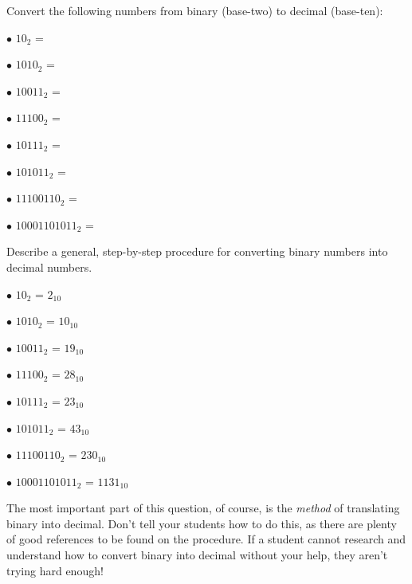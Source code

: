 

Convert the following numbers from binary (base-two) to decimal (base-ten):

\medskip
\item{$\bullet$} $10_2$ =
\item{$\bullet$} $1010_2$ =
\item{$\bullet$} $10011_2$ =
\item{$\bullet$} $11100_2$ = 
\item{$\bullet$} $10111_2$ = 
\item{$\bullet$} $101011_2$ = 
\item{$\bullet$} $11100110_2$ = 
\item{$\bullet$} $10001101011_2$ = 
\medskip

Describe a general, step-by-step procedure for converting binary numbers into decimal numbers.







\medskip
\item{$\bullet$} $10_2$ = $2_{10}$
\item{$\bullet$} $1010_2$ = $10_{10}$
\item{$\bullet$} $10011_2$ = $19_{10}$
\item{$\bullet$} $11100_2$ =  $28_{10}$
\item{$\bullet$} $10111_2$ =  $23_{10}$
\item{$\bullet$} $101011_2$ =  $43_{10}$
\item{$\bullet$} $11100110_2$ = $230_{10}$
\item{$\bullet$} $10001101011_2$ = $1131_{10}$ 
\medskip







The most important part of this question, of course, is the {\it method} of translating binary into decimal.  Don't tell your students how to do this, as there are plenty of good references to be found on the procedure.  If a student cannot research and understand how to convert binary into decimal without your help, they aren't trying hard enough!




